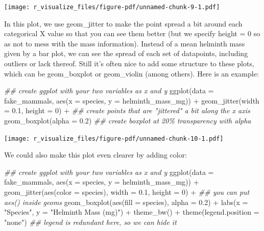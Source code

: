 \documentclass[
  letterpaper,
  DIV=11,
  numbers=noendperiod]{scrreprt}
\newenvironment{Shaded}{\begin{snugshade}}{\end{snugshade}}
\newcommand{\AttributeTok}[1]{\textcolor[rgb]{0.40,0.45,0.13}{#1}}
\newcommand{\DecValTok}[1]{\textcolor[rgb]{0.68,0.00,0.00}{#1}}
\newcommand{\DocumentationTok}[1]{\textcolor[rgb]{0.37,0.37,0.37}{\textit{#1}}}
\newcommand{\FloatTok}[1]{\textcolor[rgb]{0.68,0.00,0.00}{#1}}
\newcommand{\FunctionTok}[1]{\textcolor[rgb]{0.28,0.35,0.67}{#1}}
\newcommand{\NormalTok}[1]{\textcolor[rgb]{0.00,0.23,0.31}{#1}}
\newcommand{\SpecialCharTok}[1]{\textcolor[rgb]{0.37,0.37,0.37}{#1}}
\newcommand{\StringTok}[1]{\textcolor[rgb]{0.13,0.47,0.30}{#1}}
\begin{document}
\texttt{[image: r\_visualize\_files/figure-pdf/unnamed-chunk-9-1.pdf]}

In this plot, we use geom\_jitter to make the point spread a bit around
each categorical X value so that you can see them better (but we specify
height = 0 so as not to mess with the mass information). Instead of a
mean helminth mass given by a bar plot, we can see the spread of each
set of datapoints, including outliers or lack thereof. Still it's often
nice to add some structure to these plots, which can be geom\_boxplot or
geom\_violin (among others). Here is an example:

\begin{Shaded}
\begin{Highlighting}[]
\DocumentationTok{\#\# create ggplot with your two variables as x and y}
\FunctionTok{ggplot}\NormalTok{(}\AttributeTok{data =}\NormalTok{ fake\_mammals, }\FunctionTok{aes}\NormalTok{(}\AttributeTok{x =}\NormalTok{ species, }\AttributeTok{y =}\NormalTok{ helminth\_mass\_mg)) }\SpecialCharTok{+}
  \FunctionTok{geom\_jitter}\NormalTok{(}\AttributeTok{width =} \FloatTok{0.1}\NormalTok{, }\AttributeTok{height =} \DecValTok{0}\NormalTok{) }\SpecialCharTok{+} \DocumentationTok{\#\# create points that are "jittered" a bit along the x axis}
  \FunctionTok{geom\_boxplot}\NormalTok{(}\AttributeTok{alpha =} \FloatTok{0.2}\NormalTok{) }\DocumentationTok{\#\# create boxplot at 20\% transparency with alpha}
\end{Highlighting}
\end{Shaded}

\texttt{[image: r\_visualize\_files/figure-pdf/unnamed-chunk-10-1.pdf]}

We could also make this plot even clearer by adding color:

\begin{Shaded}
\begin{Highlighting}[]
\DocumentationTok{\#\# create ggplot with your two variables as x and y}
\FunctionTok{ggplot}\NormalTok{(}\AttributeTok{data =}\NormalTok{ fake\_mammals, }\FunctionTok{aes}\NormalTok{(}\AttributeTok{x =}\NormalTok{ species, }\AttributeTok{y =}\NormalTok{ helminth\_mass\_mg)) }\SpecialCharTok{+}
  \FunctionTok{geom\_jitter}\NormalTok{(}\FunctionTok{aes}\NormalTok{(}\AttributeTok{color =}\NormalTok{ species), }\AttributeTok{width =} \FloatTok{0.1}\NormalTok{, }\AttributeTok{height =} \DecValTok{0}\NormalTok{) }\SpecialCharTok{+} \DocumentationTok{\#\# you can put aes() inside geoms}
  \FunctionTok{geom\_boxplot}\NormalTok{(}\FunctionTok{aes}\NormalTok{(}\AttributeTok{fill =}\NormalTok{ species), }\AttributeTok{alpha =} \FloatTok{0.2}\NormalTok{) }\SpecialCharTok{+}
  \FunctionTok{labs}\NormalTok{(}\AttributeTok{x =} \StringTok{"Species"}\NormalTok{, }\AttributeTok{y =} \StringTok{"Helminth Mass (mg)"}\NormalTok{) }\SpecialCharTok{+}
  \FunctionTok{theme\_bw}\NormalTok{() }\SpecialCharTok{+}
  \FunctionTok{theme}\NormalTok{(}\AttributeTok{legend.position =} \StringTok{"none"}\NormalTok{) }\DocumentationTok{\#\# legend is redundant here, so we can hide it}
\end{Highlighting}
\end{Shaded}
\end{document}

